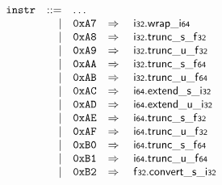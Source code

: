 \vspace{1ex}

$$
\begin{array}[t]{@{}lrrl@{}l@{}l@{}l@{}}
& {\mathtt{instr}} & ::= & \dots \\
& & | & \mathtt{0xA7} & \quad\Rightarrow\quad{} & \mathsf{i{\scriptstyle 32}} {.} {\mathsf{wrap}}{\mathsf{\_}}{\mathsf{i{\scriptstyle 64}}} \\
& & | & \mathtt{0xA8} & \quad\Rightarrow\quad{} & \mathsf{i{\scriptstyle 32}} {.} {{\mathsf{trunc}}{\mathsf{\_}}{\mathsf{s}}}{\mathsf{\_}}{\mathsf{f{\scriptstyle 32}}} \\
& & | & \mathtt{0xA9} & \quad\Rightarrow\quad{} & \mathsf{i{\scriptstyle 32}} {.} {{\mathsf{trunc}}{\mathsf{\_}}{\mathsf{u}}}{\mathsf{\_}}{\mathsf{f{\scriptstyle 32}}} \\
& & | & \mathtt{0xAA} & \quad\Rightarrow\quad{} & \mathsf{i{\scriptstyle 32}} {.} {{\mathsf{trunc}}{\mathsf{\_}}{\mathsf{s}}}{\mathsf{\_}}{\mathsf{f{\scriptstyle 64}}} \\
& & | & \mathtt{0xAB} & \quad\Rightarrow\quad{} & \mathsf{i{\scriptstyle 32}} {.} {{\mathsf{trunc}}{\mathsf{\_}}{\mathsf{u}}}{\mathsf{\_}}{\mathsf{f{\scriptstyle 64}}} \\
& & | & \mathtt{0xAC} & \quad\Rightarrow\quad{} & \mathsf{i{\scriptstyle 64}} {.} {{\mathsf{extend}}{\mathsf{\_}}{\mathsf{s}}}{\mathsf{\_}}{\mathsf{i{\scriptstyle 32}}} \\
& & | & \mathtt{0xAD} & \quad\Rightarrow\quad{} & \mathsf{i{\scriptstyle 64}} {.} {{\mathsf{extend}}{\mathsf{\_}}{\mathsf{u}}}{\mathsf{\_}}{\mathsf{i{\scriptstyle 32}}} \\
& & | & \mathtt{0xAE} & \quad\Rightarrow\quad{} & \mathsf{i{\scriptstyle 64}} {.} {{\mathsf{trunc}}{\mathsf{\_}}{\mathsf{s}}}{\mathsf{\_}}{\mathsf{f{\scriptstyle 32}}} \\
& & | & \mathtt{0xAF} & \quad\Rightarrow\quad{} & \mathsf{i{\scriptstyle 64}} {.} {{\mathsf{trunc}}{\mathsf{\_}}{\mathsf{u}}}{\mathsf{\_}}{\mathsf{f{\scriptstyle 32}}} \\
& & | & \mathtt{0xB0} & \quad\Rightarrow\quad{} & \mathsf{i{\scriptstyle 64}} {.} {{\mathsf{trunc}}{\mathsf{\_}}{\mathsf{s}}}{\mathsf{\_}}{\mathsf{f{\scriptstyle 64}}} \\
& & | & \mathtt{0xB1} & \quad\Rightarrow\quad{} & \mathsf{i{\scriptstyle 64}} {.} {{\mathsf{trunc}}{\mathsf{\_}}{\mathsf{u}}}{\mathsf{\_}}{\mathsf{f{\scriptstyle 64}}} \\
& & | & \mathtt{0xB2} & \quad\Rightarrow\quad{} & \mathsf{f{\scriptstyle 32}} {.} {{\mathsf{convert}}{\mathsf{\_}}{\mathsf{s}}}{\mathsf{\_}}{\mathsf{i{\scriptstyle 32}}} \\

\end{array}$$
